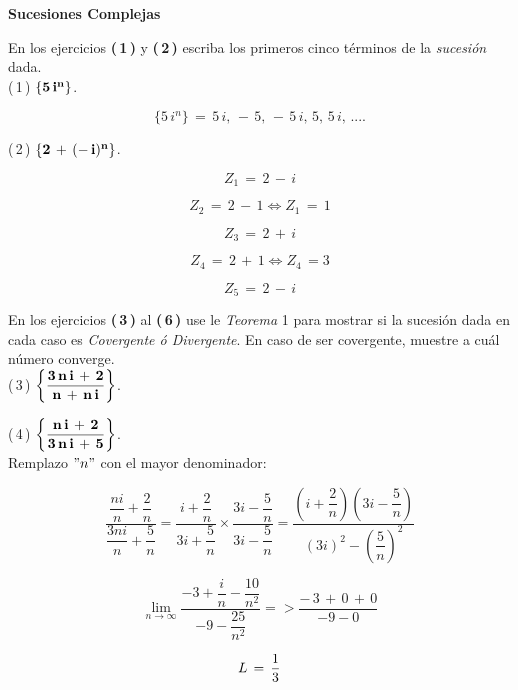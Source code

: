 \documentclass[a4paper,11pt,openany]{book}
\begin{document}
\newpage




\begin{center}
\textbf{Sucesiones Complejas}
\end{center}

En los ejercicios \textbf{(\,1\,)} y \textbf{(\,2\,)} escriba los primeros cinco términos de la {\it sucesión} dada.\\

\textcolor{ao(english)}{(\,1\,)} $\bf{\{5\,i^{n}\}}$.

$$\{5\,i^{n}\}\,=\,5\,i,\,-\,5,\,-\,5\,i,\,5,\,5\,i,\,....$$

\textcolor{ao(english)}{(\,2\,)} $\bf{\{2\,+\,(-\,i)^{n}\}}$.

$$ Z_{1}\,=\,2\,-\,i $$

$$ Z_{2}\,=\,2\,-\,1 \iff Z_{1}\,=\,1  $$

$$ Z_{3}\,=\,2\,+\,i $$

$$ Z_{4}\,=\,2\,+\,1 \iff Z_{4}\,= 3$$

$$ Z_{5}\,=\,2\,-\,i $$

En los ejercicios \textbf{(\,3\,)} al \textbf{(\,6\,)} use le \textcolor{mediumviolet-red}{{\it Teorema} 1} para mostrar si la sucesión dada en cada caso es {\it Covergente ó Divergente}. En caso de ser covergente, muestre a cuál número converge.\\

\textcolor{ao(english)}{(\,3\,)} $\bf{\left\{\dfrac{3\,n\,i\,+\,2}{n\,+\,n\,i}\right\}}$.

\textcolor{ao(english)}{(\,4\,)} $\bf{\left\{\dfrac{n\,i\,+\,2}{3\,n\,i\,+\,5}\right\}}$.\\

 Remplazo $"n"$ con el mayor denominador:
 
 $$\dfrac{\dfrac{n i}{n}+\dfrac{2}{n}}{\dfrac{3n i}{n}+\dfrac{5}{n}} = \dfrac{i+\dfrac{2}{n}}{3i+\dfrac{5}{n}} \times \dfrac{3i-\dfrac{5}{n}}{3i-\dfrac{5}{n}} = \dfrac{\left(i+ \dfrac{2}{n} \right) \left(3i- \dfrac{5}{n} \right)}{ (3i)^{2} -\left( \dfrac{5}{n} \right)^{2} } $$
 
 $$\displaystyle\lim_{n \to \infty} \dfrac{-3+\dfrac{i}{n}-\dfrac{10}{n^{2}}}{-9-\dfrac{25}{n^{2}}} => \dfrac{-\,3\,+\,0\,+\,0}{-9 -0} $$
 
 $$\mathnormal{L}\,=\,\dfrac{1}{3}$$
\end{document}

